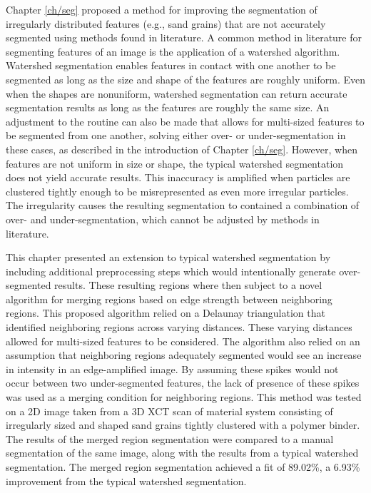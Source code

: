Chapter \ref{ch/seg} proposed a method for improving the segmentation
of irregularly distributed features (e.g., sand grains) that are not
accurately segmented using
methods found in literature. A common method in literature for segmenting
features of an image is the application of a watershed algorithm.
Watershed segmentation enables features
in contact with one another to be segmented as long as the size and shape of
the features are roughly uniform.
Even when the shapes are nonuniform, watershed segmentation can return
accurate segmentation results as long as the features are roughly the same
size. An adjustment to the routine can also be made that allows for
multi-sized features to be segmented from one another, solving either over-
or under-segmentation in these cases, as described in
the introduction of Chapter \ref{ch/seg}.
However, when features are not uniform in size or shape,
the typical watershed segmentation does not yield accurate results.
This inaccuracy is amplified when particles are clustered tightly
enough to be misrepresented as even more irregular particles.
The irregularity causes the resulting segmentation to contained a
combination of over- and under-segmentation, which cannot be adjusted by
methods in literature.

This chapter presented an extension to typical watershed segmentation by
including additional preprocessing steps which would intentionally generate
over-segmented results. These resulting regions where then subject to a novel
algorithm for merging regions based on edge strength between neighboring
regions. This proposed algorithm relied on a Delaunay triangulation that
identified neighboring regions across varying distances. These varying
distances allowed for multi-sized features to be considered.
The algorithm also relied on an assumption that neighboring regions
adequately segmented would see an increase in intensity in an edge-amplified
image. By assuming these spikes would not occur between two under-segmented
features, the lack of presence of these spikes was used as a merging
condition for neighboring regions.
This method was tested on a 2D image taken from a 3D XCT scan of
material system consisting of irregularly sized and shaped sand grains
tightly clustered with a polymer binder. The results of the merged region
segmentation were compared to a manual segmentation of the same image,
along with the results from a typical watershed segmentation.
The merged region segmentation achieved a fit of 89.02\%, a 6.93\%
improvement from the typical watershed segmentation.

